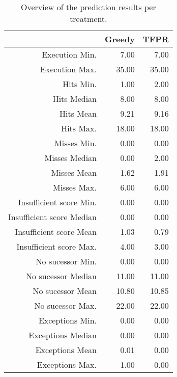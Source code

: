 \begin{table}[ht]
\centering
\begin{tabular}{rrr}
  \hline
 & Greedy & TFPR \\ 
  \hline
Execution Min. & 7.00 & 7.00 \\ 
  Execution Max. & 35.00 & 35.00 \\ 
  Hits Min. & 1.00 & 2.00 \\ 
  Hits Median & 8.00 & 8.00 \\ 
  Hits Mean & 9.21 & 9.16 \\ 
  Hits Max. & 18.00 & 18.00 \\ 
  Misses Min. & 0.00 & 0.00 \\ 
  Misses Median & 0.00 & 2.00 \\ 
  Misses Mean & 1.62 & 1.91 \\ 
  Misses Max. & 6.00 & 6.00 \\ 
  Insufficient score Min. & 0.00 & 0.00 \\ 
  Insufficient score Median & 0.00 & 0.00 \\ 
  Insufficient score Mean & 1.03 & 0.79 \\ 
  Insufficient score Max. & 4.00 & 3.00 \\ 
  No sucessor Min. & 0.00 & 0.00 \\ 
  No sucessor Median & 11.00 & 11.00 \\ 
  No sucessor Mean & 10.80 & 10.85 \\ 
  No sucessor Max. & 22.00 & 22.00 \\ 
  Exceptions Min. & 0.00 & 0.00 \\ 
  Exceptions Median & 0.00 & 0.00 \\ 
  Exceptions Mean & 0.01 & 0.00 \\ 
  Exceptions Max. & 1.00 & 0.00 \\ 
   \hline
\end{tabular}
\caption{Overview of the prediction results per treatment.} 
\label{tab:results:rq4:summary:treatment:counts}
\end{table}
